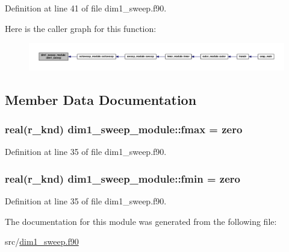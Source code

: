Definition at line 41 of file dim1\-\_\-sweep.\-f90.



Here is the caller graph for this function\-:\nopagebreak
\begin{figure}[H]
\begin{center}
\leavevmode
\includegraphics[width=350pt]{classdim1__sweep__module_aa0a270b2504bf7da636d3b3eaecdea16_icgraph}
\end{center}
\end{figure}




\subsection{Member Data Documentation}
\hypertarget{classdim1__sweep__module_a973f03dda9d8fe7662d437c0c790f3a2}{
\subsubsection[{fmax}]{\setlength{\rightskip}{0pt plus 5cm}real(r\-\_\-knd) dim1\-\_\-sweep\-\_\-module\-::fmax = zero}}\label{classdim1__sweep__module_a973f03dda9d8fe7662d437c0c790f3a2}


Definition at line 35 of file dim1\-\_\-sweep.\-f90.

\hypertarget{classdim1__sweep__module_a9b0ce6702181b5c9bf98ac179929a1aa}{
\subsubsection[{fmin}]{\setlength{\rightskip}{0pt plus 5cm}real(r\-\_\-knd) dim1\-\_\-sweep\-\_\-module\-::fmin = zero}}\label{classdim1__sweep__module_a9b0ce6702181b5c9bf98ac179929a1aa}


Definition at line 35 of file dim1\-\_\-sweep.\-f90.



The documentation for this module was generated from the following file\-:\begin{DoxyCompactItemize}
\item 
src/\hyperlink{dim1__sweep_8f90}{dim1\-\_\-sweep.\-f90}\end{DoxyCompactItemize}
